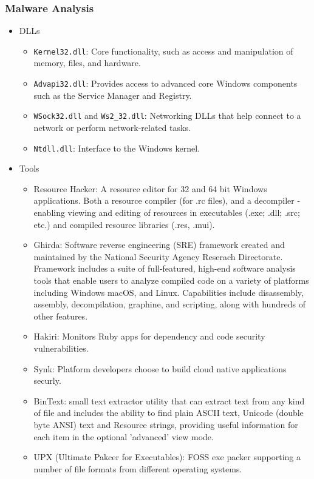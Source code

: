 \subsubsection{Malware Analysis}
\begin{itemize}
    \item DLLs
    \begin{itemize}
        \item \verb|Kernel32.dll|: Core functionality, such as access and manipulation of memory, files, and hardware.
        \item \verb|Advapi32.dll|: Provides access to advanced core Windows components such as the Service Manager and Registry.
        \item \verb|WSock32.dll| and \verb|Ws2_32.dll|: Networking DLLs that help connect to a network or perform network-related tasks.
        \item \verb|Ntdll.dll|: Interface to the Windows kernel.
    \end{itemize}
    \item Tools
    \begin{itemize}
        \item Resource Hacker: A resource editor for 32 and 64 bit Windows applications. Both a resource compiler (for .rc files), and a decompiler - enabling viewing and editing of resources in executables (.exe; .dll; .src; etc.) and compiled resource libraries (.res, .mui).
        \item Ghirda: Software reverse engineering (SRE) framework created and maintained by the National Security Agency Reserach Directorate. Framework includes a suite of full-featured, high-end software analysis tools that enable users to analyze compiled code on a variety of platforms including Windows macOS, and Linux. Capabilities include disassembly, assembly, decompilation, graphine, and scripting, along with hundreds of other features.
        \item Hakiri: Monitors Ruby apps for dependency and code security vulnerabilities.
        \item Synk: Platform developers choose to build cloud native applications securly.
        \item BinText: small text extractor utility that can extract text from any kind of file and includes the ability to find plain ASCII text, Unicode (double byte ANSI) text and Resource strings, providing useful information for each item in the optional 'advanced' view mode.
        \item UPX (Ultimate Pakcer for Executables): FOSS exe packer supporting a number of file formats from different operating systems.

\end{itemize}
\end{itemize}
